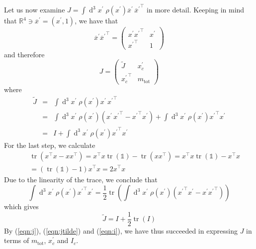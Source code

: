 \documentclass[a4paper]{article}
\begin{document}
Let us now examine $J = \int \operatorname{d}^3\!x^\prime\; \rho(x^\prime) \overline{x}^\prime\,{\overline{x}^\prime}^\top$ in more detail. Keeping in mind that $\mathbb{R}^4 \ni \overline{x}^\prime = (x^\prime, 1)$, we have that
\begin{equation}
\overline{x}^\prime {\overline{x}^\prime}^\top =
\left(\begin{array}{cc}
x^\prime {x^\prime}^\top & x^\prime\\
{x^\prime}^\top & 1
\end{array}\right)
\end{equation}
and therefore
\begin{equation}
\label{eqn:j}
J = \left(\begin{array}{cc}
\tilde{J} & x_c^\prime\\
{x_c^\prime}^\top & m_\mathrm{tot}
\end{array}\right)
\end{equation}
where
\begin{eqnarray}
\nonumber \tilde{J} &=& \int \operatorname{d}^3\!x^\prime\; \rho(x^\prime) x^\prime\,{x^\prime}^\top\\
\nonumber &=& \int \operatorname{d}^3\!x^\prime\; \rho(x^\prime) \left(x^\prime\,{x^\prime}^\top - {x^\prime}^\top x^\prime \right) + \int \operatorname{d}^3\!x^\prime\; \rho(x^\prime) {x^\prime}^\top{x^\prime}\\
&=& I + \int \operatorname{d}^3\!x^\prime\; \rho(x^\prime) {x^\prime}^\top{x^\prime}
\end{eqnarray}
For the last step, we calculate
\begin{eqnarray}
\nonumber&&\operatorname{tr}(x^\top x - x x^\top)
= x^\top x \operatorname{tr}(\mathbb{1}) - \operatorname{tr}(xx^\top)
= x^\top x \operatorname{tr}(\mathbb{1}) - x^\top x\\
&&= (\operatorname{tr}(\mathbb{1}) - 1) x^\top x
= 2 x^\top x
\end{eqnarray}
Due to the linearity of the trace, we conclude that
\begin{equation}
\int\operatorname{d}^3\!x^\prime\; \rho(x^\prime) {x^\prime}^\top x^\prime
= \frac{1}{2} \operatorname{tr} \left( \int\operatorname{d}^3\!x^\prime\; \rho(x^\prime) \left( {x^\prime}^\top x^\prime - x^\prime {x^\prime}^\top \right) \right)
\end{equation}
which gives
\begin{equation}
\label{eqn:jtilde}
\tilde{J} = I + \frac{1}{2} \operatorname{tr}(I)
\end{equation}
By (\ref{eqn:j}), (\ref{eqn:jtilde}) and (\ref{eqn:i}), we have thus succeeded in expressing $J$ in terms of $m_\mathrm{tot}$, $x_c^\prime$ and $I_c$.
\end{document}
